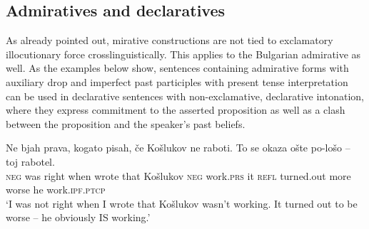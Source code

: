 \documentclass[output=paper,
colorlinks,
citecolor=brown,
newtxmath
]{langscibook}
\begin{document}

\subsection{Admiratives and declaratives}\label{sec:decl}

As already pointed out, mirative constructions are not tied to exclamatory illocutionary force crosslinguistically. This applies to the Bulgarian admirative as well. As the examples below show, sentences containing admirative forms with auxiliary drop and imperfect past participles with present tense interpretation can be used in declarative sentences with non-exclamative, declarative intonation, where they express commitment to the asserted proposition as well as a clash between the proposition and the speaker's past beliefs.

\ea \label{ex:koslukov}
\gll Ne bjah prava, kogato pisah, če Košlukov ne raboti. %
To se okaza ošte po-lošo -- toj rabotel. \\
\textsc{neg} was right when wrote that Košlukov \textsc{neg} work.\textsc{prs}
 it \textsc{refl} turned.out more worse {} he work.\textsc{ipf.ptcp}\\
\glt `I was not right when I wrote that Košlukov wasn't working. It turned out to be worse -- he obviously IS working.'
\z
\end{document}

